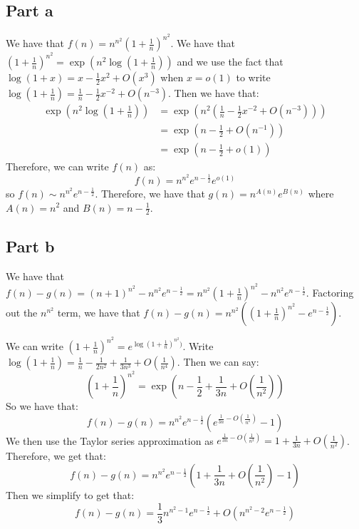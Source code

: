 \documentclass[]{article}
\begin{document}
\subsection{Part a}
We have that $f(n) = n^{n^2}(1 + \frac{1}{n})^{n^2}$. We have that $(1 + \frac{1}{n})^{n^2} = \exp\left(n^2 \log(1 + \frac{1}{n})\right)$ and we use the fact that $\log(1 + x) = x - \frac{1}{2}x^2 + O(x^3)$ when $x = o(1)$ to write $\log(1 + \frac{1}{n}) = \frac{1}{n} - \frac{1}{2}x^{-2} + O(n^{-3})$. Then we have that:
\begin{align*}
	\exp\left(n^2 \log(1 + \frac{1}{n})\right) &= \exp\left(n^2 \left(\frac{1}{n} - \frac{1}{2}x^{-2} + O(n^{-3}) \right)\right)\\
	&=  \exp\left( n  - \frac{1}{2}+ O(n^{-1})\right)\\
	&= \exp\left( n  - \frac{1}{2}+ o(1)\right)
\end{align*}
Therefore, we can write $f(n)$ as:
\begin{equation}
	f(n) = n^{n^2}e^{n - \frac{1}{2}}e^{o(1)}
\end{equation}
so $f(n) \sim n^{n^2}e^{n - \frac{1}{2}}$. 
Therefore, we have that $g(n) = n^{A(n)}e^{B(n)}$ where $A(n) = n^2$ and $B(n) = n - \frac{1}{2}$. 

\subsection{Part b}
We have that $f(n) - g(n) = (n + 1)^{n^2} - n^{n^2}e^{n - \frac{1}{2}} = n^{n^2}(1 + \frac{1}{n})^{n^2} - n^{n^2}e^{n - \frac{1}{2}}$. Factoring out the $n^{n^2}$ term, we have that $f(n) - g(n) = n^{n^2}\left((1 + \frac{1}{n})^{n^2} - e^{n - \frac{1}{2}} \right)$.

We can write $(1 + \frac{1}{n})^{n^2} = e^{\log(1 + \frac{1}{n})^{n^2})}$. Write $\log(1 + \frac{1}{n}) = \frac{1}{n} - \frac{1}{2 n^2} + \frac{1}{3 n^3} + O(\frac{1}{n^4})$. Then we can say:
\begin{equation}
	(1 + \frac{1}{n})^{n^2} = \exp(n - \frac{1}{2} + \frac{1}{3n} + O(\frac{1}{n^2}))
\end{equation}
So we have that:
\begin{equation}
	f(n) - g(n) = n^{n^2}e^{n - \frac{1}{2}}(e^{\frac{1}{3n} - O(\frac{1}{n^2})} - 1)
\end{equation}
We then use the Taylor series approximation as $e^{\frac{1}{3n} - O(\frac{1}{n^2})} = 1 + \frac{1}{3n} + O(\frac{1}{n^2})$.
Therefore, we get that:
\begin{equation}
	f(n) - g(n) = n^{n^2}e^{n - \frac{1}{2}}(1 + \frac{1}{3n} + O(\frac{1}{n^2}) - 1)
\end{equation}
Then we simplify to get that:
\begin{equation}
	f(n) - g(n) = \frac{1}{3} n^{n^2 - 1}e^{n - \frac{1}{2}} + O(n^{n^2 - 2}e^{n - \frac{1}{2}})
\end{equation}
\end{document}
